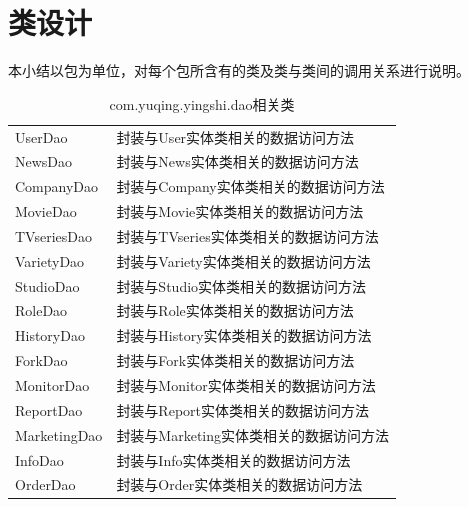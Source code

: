 \section{类设计}
本小结以包为单位，对每个包所含有的类及类与类间的调用关系进行说明。
\begin{table}
	\caption{com.yuqing.yingshi.dao相关类}
	\centering
\begin{tabular}{|p{3cm}|p{10cm}|} 
\hline 
\rowcolor[HTML]{DAE8FC} 
\multicolumn{2}{|c|}{com.yuqing.yingshi.dao相关类} \\ 
\hline 
UserDao&封装与User实体类相关的数据访问方法\\
NewsDao&封装与News实体类相关的数据访问方法\\
CompanyDao&封装与Company实体类相关的数据访问方法\\
MovieDao&封装与Movie实体类相关的数据访问方法\\
TVseriesDao&封装与TVseries实体类相关的数据访问方法\\
VarietyDao&封装与Variety实体类相关的数据访问方法\\
StudioDao&封装与Studio实体类相关的数据访问方法\\
RoleDao&封装与Role实体类相关的数据访问方法\\
HistoryDao&封装与History实体类相关的数据访问方法\\
ForkDao&封装与Fork实体类相关的数据访问方法\\
MonitorDao&封装与Monitor实体类相关的数据访问方法\\
ReportDao&封装与Report实体类相关的数据访问方法\\
MarketingDao&封装与Marketing实体类相关的数据访问方法\\
InfoDao&封装与Info实体类相关的数据访问方法\\
OrderDao &封装与Order实体类相关的数据访问方法\\
\hline 
\end{tabular}
\end{table}

